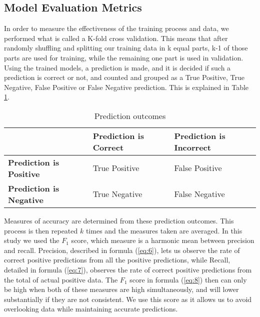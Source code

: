 \documentclass[review]{elsarticle}
\begin{document}



\subsection{Model Evaluation Metrics}
\label{model_evaluation}

In order to measure the effectiveness of the training process and data, we performed what is called a K-fold cross validation. This means that after randomly shuffling and splitting our training data in k equal parts, k-1 of those parts are used for training, while the remaining one part is used in validation. Using the trained models, a prediction is made, and it is decided if such a prediction is correct or not, and counted and grouped as a True Positive, True Negative, False Positive or False Negative prediction. This is explained in Table \ref{tab:preds}.

\begin{table}[htp] \centering
\caption{Prediction outcomes}\label{tab:preds}
\begin{tabular}{|>{\centering\arraybackslash}m{7em}|>{\centering\arraybackslash}m{7em}|>{\centering\arraybackslash}m{7em}|} \arrayrulecolor{white}\hline %
\multicolumn{1}{c|}{} & \cellcolor{Mustard}\textbf{Prediction is Correct} & \cellcolor{LightPlum}\textbf{Prediction is Incorrect} \\ \hline
\cellcolor{DarkBlue}\textbf{Prediction is Positive} & \cellcolor{DeepGreen}True Positive & \cellcolor{DeepPurple}False Positive \\ \hline
\cellcolor{DeepSalmon}\textbf{Prediction is Negative} & \cellcolor{orange}True Negative & \cellcolor{Plum}False Negative \\ \hline
\end{tabular}
\end{table}

Measures of accuracy are determined from these prediction outcomes. This process is then repeated \(k\) times and the measures taken are averaged. In this study we used the \(F_{1}\) score, which measure is a harmonic mean between precision and recall. Precision, described in formula (\ref{eq:6}), lets us observe the rate of correct positive predictions from all the positive predictions, while Recall, detailed in formula (\ref{eq:7}), observes the rate of correct positive predictions from the total of actual positive data. The \(F_{1}\) score in formula (\ref{eq:8}) then can only be high when both of these measures are high simultaneously, and will lower substantially if they are not consistent. We use this score as it allows us to avoid overlooking data while maintaining accurate predictions.
\end{document}
